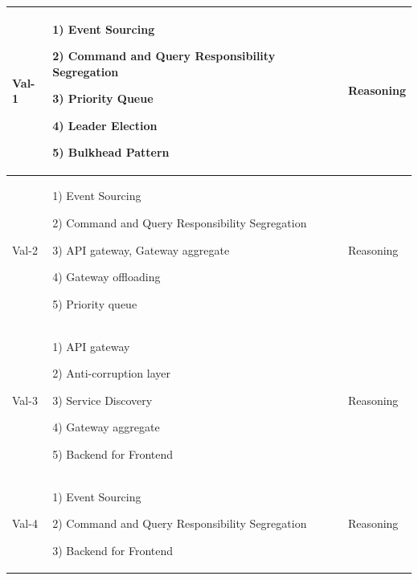 \documentclass[conference]{IEEEtran}
\begin{document}
\begin{center}
    \begin{table}
    \renewcommand*{\arraystretch}{1.8}
    \begin{tabular}{ | m{2cm} | m{8cm} |  m{2cm} |}
        \hline

        Val-1 &  

        1) Event Sourcing

        2) Command and Query Responsibility Segregation

        3) Priority Queue

        4) Leader Election

        5) Bulkhead Pattern
        
        &  Reasoning 
        
        \\
        \hline

        Val-2 &  

        1) Event Sourcing

        2) Command and Query Responsibility Segregation

        3) API gateway, Gateway aggregate

        4) Gateway offloading

        5) Priority queue
        
        & Reasoning
        
        \\
        \hline

        Val-3 &  

        1) API gateway

        2) Anti-corruption layer

        3) Service Discovery

        4) Gateway aggregate

        5) Backend for Frontend
        
        & Reasoning
        
        \\
        \hline

        Val-4 &  

        1) Event Sourcing

        2) Command and Query Responsibility Segregation

        3) Backend for Frontend

        & Reasoning
        
        \\
        \hline


\end{tabular}
\end{table}
\end{center}
\end{document}
